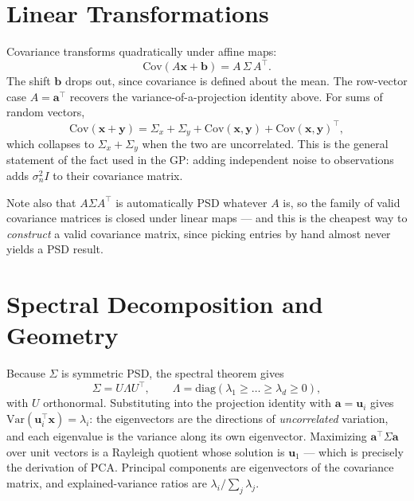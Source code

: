 \documentclass[conference]{IEEEtran}
\begin{document}
\section*{Linear Transformations}
Covariance transforms quadratically under affine maps:
\begin{equation}
    \mathrm{Cov}(A\mathbf{x} + \mathbf{b}) = A\,\Sigma\,A^{\!\top} .
\end{equation}
The shift $\mathbf{b}$ drops out, since covariance is defined about the mean. The row-vector case $A = \mathbf{a}^{\!\top}$ recovers the variance-of-a-projection identity above. For sums of random vectors,
\begin{equation}
    \mathrm{Cov}(\mathbf{x} + \mathbf{y}) = \Sigma_x + \Sigma_y + \mathrm{Cov}(\mathbf{x},\mathbf{y}) + \mathrm{Cov}(\mathbf{x},\mathbf{y})^{\!\top},
\end{equation}
which collapses to $\Sigma_x + \Sigma_y$ when the two are uncorrelated. This is the general statement of the fact used in the GP: adding independent noise to observations adds $\sigma_n^2 I$ to their covariance matrix.

Note also that $A\Sigma A^{\!\top}$ is automatically PSD whatever $A$ is, so the family of valid covariance matrices is closed under linear maps --- and this is the cheapest way to \textit{construct} a valid covariance matrix, since picking entries by hand almost never yields a PSD result.

\section*{Spectral Decomposition and Geometry}
Because $\Sigma$ is symmetric PSD, the spectral theorem gives
\begin{equation}
    \Sigma = U \Lambda U^{\!\top}, \qquad \Lambda = \mathrm{diag}(\lambda_1 \geq \dots \geq \lambda_d \geq 0),
\end{equation}
with $U$ orthonormal. Substituting into the projection identity with $\mathbf{a} = \mathbf{u}_i$ gives $\mathrm{Var}(\mathbf{u}_i^{\!\top}\mathbf{x}) = \lambda_i$: the eigenvectors are the directions of \textit{uncorrelated} variation, and each eigenvalue is the variance along its own eigenvector. Maximizing $\mathbf{a}^{\!\top}\Sigma\mathbf{a}$ over unit vectors is a Rayleigh quotient whose solution is $\mathbf{u}_1$ --- which is precisely the derivation of PCA. Principal components are eigenvectors of the covariance matrix, and explained-variance ratios are $\lambda_i / \sum_j \lambda_j$.
\end{document}
